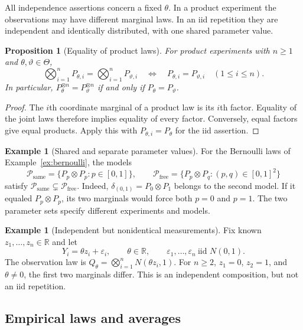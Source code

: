 \documentclass[11pt,oneside]{book}
\newtheorem{proposition}[theorem]{Proposition}
\theoremstyle{definition}
\newtheorem{example}[theorem]{Example}
\theoremstyle{remark}
\newcommand{\R}{\mathbb R}
\begin{document}
All independence assertions concern a fixed $\theta$. In a product experiment
the observations may have different marginal laws. In an iid repetition they
are independent and identically distributed, with one shared parameter value.

\begin{proposition}[Equality of product laws]
\label{prop:product-law-equality}
For product experiments with $n\geq1$ and $\theta,\vartheta\in\Theta$,
\[
\bigotimes_{i=1}^nP_{\theta,i}
=\bigotimes_{i=1}^nP_{\vartheta,i}
\quad\Longleftrightarrow\quad
P_{\theta,i}=P_{\vartheta,i}\quad(1\leq i\leq n).
\]
In particular,
$P_\theta^{\otimes n}=P_\vartheta^{\otimes n}$ if and only if
$P_\theta=P_\vartheta$.
\end{proposition}
\begin{proof}
The $i$th coordinate marginal of a product law is its $i$th factor.
Equality of the joint laws therefore implies equality of every factor.
Conversely, equal factors give equal products. Apply this with
$P_{\theta,i}=P_\theta$ for the iid assertion.
\end{proof}
\begin{example}[Shared and separate parameter values]
\label{ex:shared-sampling-parameter}
For the Bernoulli laws of Example~\ref{ex:bernoulli}, the models
\[
\mathcal P_{\mathrm{same}}
=\{P_p\otimes P_p:p\in[0,1]\},\qquad
\mathcal P_{\mathrm{free}}
=\{P_p\otimes P_q:(p,q)\in[0,1]^2\}
\]
satisfy $\mathcal P_{\mathrm{same}}\subsetneq\mathcal P_{\mathrm{free}}$.
Indeed, $\delta_{(0,1)}=P_0\otimes P_1$ belongs to the second model.
If it equaled $P_p\otimes P_p$, its two marginals would force both $p=0$
and $p=1$. The two parameter sets specify different experiments and models.
\end{example}

\begin{example}[Independent but nonidentical measurements]
\label{ex:fixed-design-gaussian}
Fix known $z_1,\ldots,z_n\in\R$ and let
\[
Y_i=\theta z_i+\varepsilon_i,\qquad
\theta\in\R,\qquad
\varepsilon_1,\ldots,\varepsilon_n\ \text{iid }N(0,1).
\]
The observation law is $Q_\theta=\bigotimes_{i=1}^nN(\theta z_i,1)$.
For $n\geq2$, $z_1=0$, $z_2=1$, and $\theta\ne0$, the first two marginals differ.
This is an independent composition, but not an iid repetition.
\end{example}

\subsection{Empirical laws and averages}
\label{subsec:empirical-laws}
\end{document}
